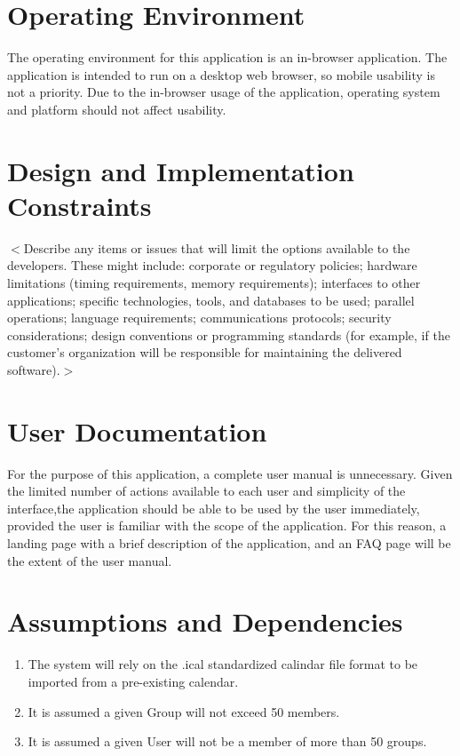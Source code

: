 \documentclass{scrreprt}
\begin{document}
\section{Operating Environment}
The operating environment for this application is an in-browser application. The
application is intended to run on a desktop web browser, so mobile usability is
not a priority. Due to the in-browser usage of the application, operating system
and platform should not affect usability.

\section{Design and Implementation Constraints}
$<$Describe any items or issues that will limit the options available to the
developers. These might include: corporate or regulatory policies; hardware
limitations (timing requirements, memory requirements); interfaces to other
applications; specific technologies, tools, and databases to be used; parallel
operations; language requirements; communications protocols; security
considerations; design conventions or programming standards (for example, if the
customer’s organization will be responsible for maintaining the delivered
software).$>$

\section{User Documentation}
For the purpose of this application, a complete user manual is unnecessary.
Given the limited number of actions available to each user and simplicity of the
interface,the application should be able to be used by the user immediately,
provided the user is familiar with the scope of the application. For this
reason, a landing page with a brief description of the application, and an FAQ
page will be the extent of the user manual.

\section{Assumptions and Dependencies}
\begin{enumerate}
\item The system will rely on the .ical standardized calindar file format to
be imported from a pre-existing calendar.
\item It is assumed a given Group will not exceed 50 members.
\item It is assumed a given User will not be a member of more than 50 groups.
\end{enumerate}
\end{document}
